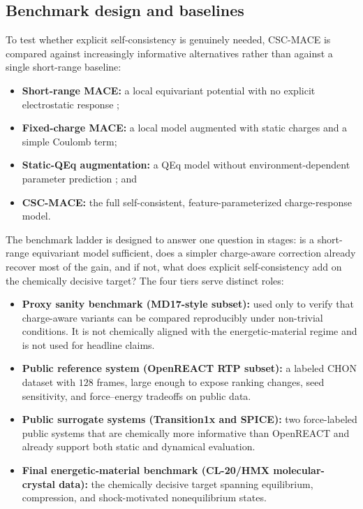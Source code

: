 \subsection{Benchmark design and baselines}
\label{sec:benchmarks}

To test whether explicit self-consistency is genuinely needed, CSC-MACE is compared against increasingly informative alternatives rather than against a single short-range baseline:
\begin{itemize}
    \item \textbf{Short-range MACE:} a local equivariant potential with no explicit electrostatic response \cite{batatia2022mace,kovacs2023mace};
    \item \textbf{Fixed-charge MACE:} a local model augmented with static charges and a simple Coulomb term;
    \item \textbf{Static-QEq augmentation:} a QEq model without environment-dependent parameter prediction \cite{rappe1991charge}; and
    \item \textbf{CSC-MACE:} the full self-consistent, feature-parameterized charge-response model.
\end{itemize}

The benchmark ladder is designed to answer one question in stages: is a short-range equivariant model sufficient, does a simpler charge-aware correction already recover most of the gain, and if not, what does explicit self-consistency add on the chemically decisive target? The four tiers serve distinct roles:
\begin{itemize}
    \item \textbf{Proxy sanity benchmark (MD17-style subset):} used only to verify that charge-aware variants can be compared reproducibly under non-trivial conditions. It is not chemically aligned with the energetic-material regime and is not used for headline claims.
    \item \textbf{Public reference system (OpenREACT RTP subset):} a labeled CHON dataset with $128$ frames, large enough to expose ranking changes, seed sensitivity, and force--energy tradeoffs on public data.
    \item \textbf{Public surrogate systems (Transition1x and SPICE):} two force-labeled public systems that are chemically more informative than OpenREACT and already support both static and dynamical evaluation.
    \item \textbf{Final energetic-material benchmark (CL-20/HMX molecular-crystal data):} the chemically decisive target spanning equilibrium, compression, and shock-motivated nonequilibrium states.
\end{itemize}

